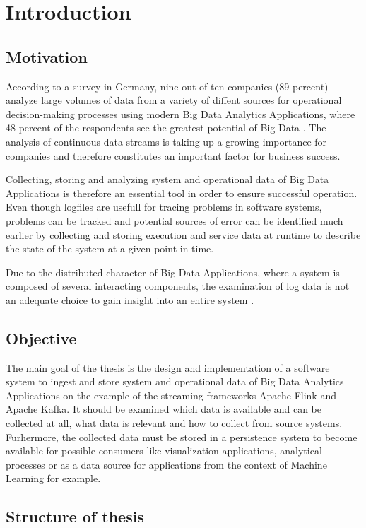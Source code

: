 \chapter{Introduction}
\section{Motivation}
According to a survey in Germany, nine out of ten companies (89 percent) analyze large
volumes of data from a variety of diffent sources for operational decision-making processes
using modern Big Data Analytics Applications, where 48 percent of the respondents see the
greatest potential of Big Data \cite{Bitk14}. The analysis of continuous data streams is
taking up a growing importance for companies and therefore constitutes an important factor
for business success.

Collecting, storing and analyzing system and operational data of Big Data Applications is
therefore an essential tool in order to ensure successful operation. Even though logfiles are
usefull for tracing problems in software systems, problems can be tracked and potential sources
of error can be identified much earlier by collecting and storing execution and service data at
runtime to describe the state of the system at a given point in time.

Due to the distributed character of Big Data Applications, where a system is composed of several
interacting components, the examination of log data is not an adequate choice to gain insight
into an entire system \cite{VanL14}.

\section{Objective}

The main goal of the thesis is the design and implementation of a software system to ingest
and  store system and operational data of Big Data Analytics Applications on the example of
the streaming frameworks Apache Flink and Apache Kafka. It should be examined which data is
available and can be collected at all, what data is relevant and how to collect from source
systems. Furhermore, the collected data must be stored in a persistence system to become
available for possible consumers like visualization applications, analytical processes or as
a data source for applications from the context of Machine Learning for example.

\section{Structure of thesis}

